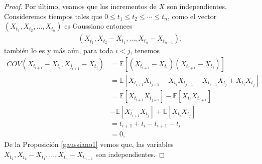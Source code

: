 \begin{proof}
Por último, veamos que los incrementos de $X$ son independientes. Consideremos tiempos tales que $0 \leq t_1 \leq t_2 \leq \cdots \leq t_n$, como el vector $(X_{t_1}, X_{t_2}, \ldots, X_{t_n})$ es Gaussiano entonces
  \begin{align*}
  	(X_{t_1}, X_{t_2} - X_{t_1}, \ldots, X_{t_n} - X_{t_{n-1}}),
  \end{align*}
también lo es y más aún, para toda $i < j$, tenemos
  \begin{align*}
  	COV(X_{t_{i + 1}} - X_{t_i}, X_{j_{i + 1}} - X_{t_j}) &= \mathbb{E} [(X_{t_{i + 1}} - X_{t_i})(X_{t_{j + 1}} - X_{t_j})] \\
    & = \mathbb{E} [X_{t_{i + 1}}X_{t_{j + 1}} - X_{t_i}X_{t_{j + 1}} - X_{t_{i + 1}}X_{t_j} + X_{t_i}X_{t_j}] \\
    & = \mathbb{E} [X_{t_{i + 1}}X_{t_{j + 1}}] - \mathbb{E}[X_{t_i}X_{t_{j + 1}}] \\
    & - \mathbb{E}[X_{t_{i + 1}}X_{t_j}] + \mathbb{E}[X_{t_i}X_{t_j}] \\
    & = t_{i+1} + t_i - t_{i+1} - t_i \\
    & = 0,
  \end{align*}
De la Proposición \ref{gaussiano1} vemos que, las variables $X_{t_1}, X_{t_2} - X_{t_1}, \ldots, X_{t_n} - X_{t_{n-1}}$ son independientes.
\end{proof}



